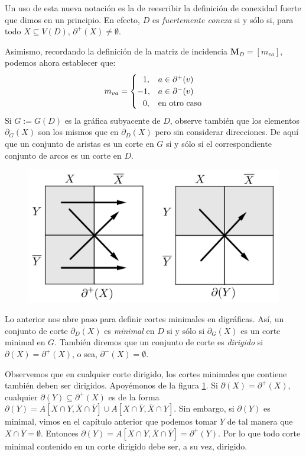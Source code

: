 Un uso de esta nueva notación es la de reescribir la definición de conexidad fuerte que dimos en un principio. En efecto, $D$ es \textit{fuertemente conexa} si y sólo si, para todo $X \subseteq V(D)$, $\partial^{+}(X) \neq \emptyset$. 

Asimismo, recordando la definición de la matriz de incidencia $\mathbf{M}_{D} = [m_{va}]$, podemos ahora establecer que:
\begin{equation} \label{eq:mva}
  m_{va}=
    \begin{cases}
\hspace{0.7em} 1, & a \in \partial^{+}(v)\\ 
-1, & a \in \partial^{-}(v)\\ 
\hspace{0.7em} 0, & \text{en otro caso}
\end{cases}
\end{equation}
Si $G:=G(D)$ es la gráfica subyacente de $D$, observe también que los elementos $\partial_{G}(X)$ son los mismos que en $\partial_{D}(X)$ pero sin considerar direcciones. De aquí que un conjunto de aristas es un corte en $G$ si y sólo si el correspondiente conjunto de arcos es un corte en $D$.

\begin{figure}[h]
    \centering
    \includegraphics[scale=0.15]{img/imgchapter2/bondsdirigidos.jpg}
    \caption{}
    \label{fig:bondsdirigidos}
\end{figure}

Lo anterior nos abre paso para definir cortes minimales en digráficas. Así, un conjunto de corte $\partial_{D}(X)$ es \textit{minimal} en $D$ si y sólo si $\partial_{G}(X)$ es un corte minimal en $G$. También diremos que un conjunto de corte es \textit{dirigido} si $\partial(X) = \partial^{+}(X)$, o sea, $\partial^{-}(X)=\emptyset$.

Observemos que en cualquier corte dirigido, los cortes minimales que contiene también deben ser dirigidos. Apoyémonos de la figura \ref{fig:bondsdirigidos}. Si $\partial(X) = \partial^{+}(X)$, cualquier $\partial(Y) \subseteq \partial^{+}(X)$ es de la forma $\partial(Y) = A[X \cap Y, \overline{X} \cap \overline{Y}] \cup A[X \cap \overline{Y}, \overline{X} \cap Y] $. Sin embargo, si $\partial(Y)$ es minimal, vimos en el capítulo anterior que podemos tomar  $Y$ de tal manera que $X \cap\overline{Y} = \emptyset$. Entonces $\partial(Y)= A[X \cap Y, \overline{X} \cap \overline{Y}] = \partial^{+}(Y)$. Por lo que todo corte minimal contenido en un corte dirigido debe ser, a su vez, dirigido.


